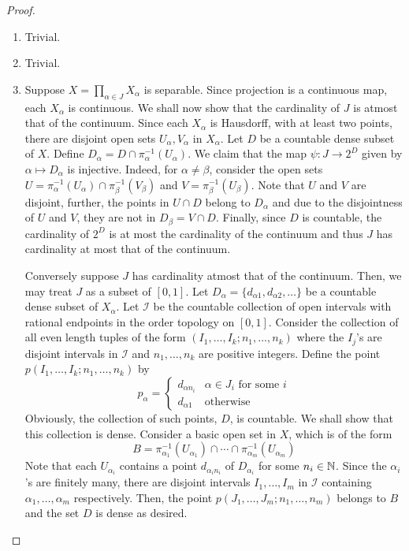 \begin{proof}
\begin{enumerate}[label=(\alph*)]
\item Trivial.
\item Trivial.
\item Suppose $X = \prod_{\alpha\in J}X_\alpha$ is separable. Since projection is a continuous map, each $X_\alpha$ is continuous. We shall now show that the cardinality of $J$ is atmost that of the continuum. Since each $X_\alpha$ is Hausdorff, with at least two points, there are disjoint open sets $U_\alpha, V_\alpha$ in $X_\alpha$. Let $D$ be a countable dense subset of $X$. Define $D_\alpha = D\cap\pi_{\alpha}^{-1}(U_\alpha)$. We claim that the map $\psi: J\to 2^D$ given by $\alpha\mapsto D_\alpha$ is injective. Indeed, for $\alpha\ne\beta$, consider the open sets $U = \pi_{\alpha}^{-1}(U_\alpha)\cap\pi_{\beta}^{-1}(V_\beta)$ and $V = \pi_{\beta}^{-1}(U_\beta)$. Note that $U$ and $V$ are disjoint, further, the points in $U\cap D$ belong to $D_\alpha$ and due to the disjointness of $U$ and $V$, they are not in $D_\beta = V\cap D$. Finally, since $D$ is countable, the cardinality of $2^D$ is at most the cardinality of the continuum and thus $J$ has cardinality at most that of the continuum.

Conversely suppose $J$ has cardinality atmost that of the continuum. Then, we may treat $J$ as a subset of $[0,1]$. Let $D_\alpha = \{d_{\alpha 1}, d_{\alpha 2},\ldots\}$ be a countable dense subset of $X_\alpha$. Let $\mathscr I$ be the countable collection of open intervals with rational endpoints in the order topology on $[0,1]$. Consider the collection of all even length tuples of the form $(I_1,\ldots,I_k;n_1,\ldots,n_k)$ where the $I_j$'s are disjoint intervals in $\mathscr I$ and $n_1,\ldots,n_k$ are positive integers. Define the point $p(I_1,\ldots,I_k;n_1,\ldots,n_k)$ by 
\begin{equation*}
    p_\alpha = 
    \begin{cases}
        d_{\alpha n_i} & \alpha\in J_i\text{ for some $i$}\\
        d_{\alpha 1} & \text{otherwise}
    \end{cases}
\end{equation*}
Obviously, the collection of such points, $D$, is countable. We shall show that this collection is dense. Consider a basic open set in $X$, which is of the form 
\begin{equation*}
    B = \pi_{\alpha_1}^{-1}(U_{\alpha_1})\cap\cdots\cap\pi_{\alpha_m}^{-1}(U_{\alpha_m})
\end{equation*}
Note that each $U_{\alpha_i}$ contains a point $d_{\alpha_in_i}$ of $D_{\alpha_i}$ for some $n_i\in\mathbb{N}$. Since the $\alpha_i$'s are finitely many, there are disjoint intervals $I_1,\ldots,I_m$ in $\mathscr I$ containing $\alpha_1,\ldots,\alpha_m$ respectively. Then, the point $p(J_1,\ldots,J_m;n_1,\ldots,n_m)$ belongs to $B$ and the set $D$ is dense as desired.
\end{enumerate}
\end{proof}

